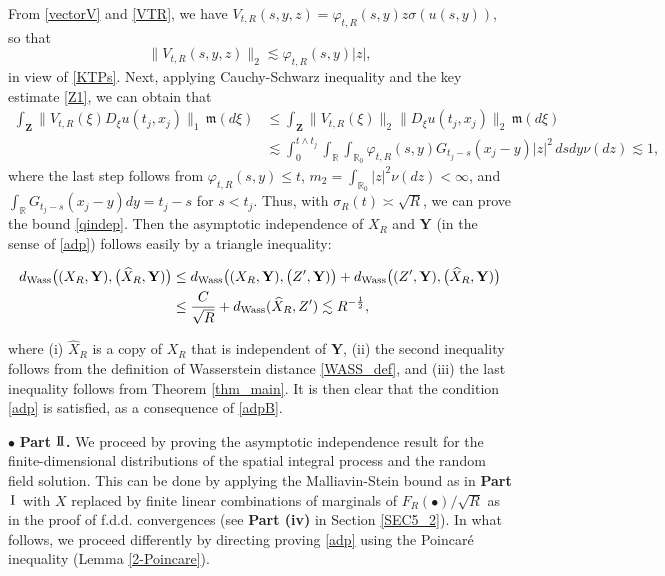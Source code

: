 \documentclass[letterpaper, 11pt,  reqno]{amsart}
\newcommand{\wh}{\widehat}
\newcommand{\I}{\hspace{0.5mm}\text{I}\hspace{0.5mm}}
\newcommand{\II}{\text{I \hspace{-2.8mm} I} }
\newcommand{\noi}{\noindent}
\newcommand{\R}{\mathbb{R}}
\newcommand{\bul}{\bullet}
\newcommand{\s}{\sigma}
\newcommand{\les}{\lesssim}
\newcommand{\fm}{\mathfrak{m}}
\numberwithin{equation}{section}
\numberwithin{theorem}{section}
\begin{document}
From \eqref{vectorV} and \eqref{VTR}, 
we have 
$V_{t,R}(s,y,z) = \varphi_{t, R}(s, y) z \s( u(s, y))$,
so that 
\[
\|V_{t,R}(s,y,z)\|_2 \les  \varphi_{t, R}(s, y) |z|, 
\]
in view of \eqref{KTPs}.
Next, applying  Cauchy-Schwarz inequality and  the key estimate \eqref{Z1},
 we can obtain that 
\begin{align*}
  \int_{\mathbf{Z}}  \big\| V_{t, R}(\xi)    D_\xi  u(t_j, x_j)   \big\|_1 \, \fm(d\xi) 
   & \leq 
   \int_{\mathbf{Z}}   \| V_{t,R}(\xi) \|_2   \| D_\xi  u(t_j, x_j)  \|_2 \, \fm(d\xi) \\
   &\les   \int_0^{t\wedge t_j} \int_\R \int_{\R_0}   \varphi_{t, R}(s, y) 
   G_{t_j-s}(x_j -y) |z|^2    \, dsdy \nu(dz) 
   \les 1,
\end{align*}
where the last step follows
from $\varphi_{t,R}(s,y) \leq t$, $m_2 = \int_{\R_0} |z|^2\nu(dz)  <\infty$,
and  $\int_\R  G_{t_j-s}(x_j -y)dy = t_j -s$ for $s< t_j$.
Thus, with $\s_R(t) \asymp \sqrt{R}$, we can prove the bound \eqref{qindep}.
Then the asymptotic independence of $X_R$ and $\mathbf{Y}$ (in the sense of 
\eqref{adp})
 follows easily by a triangle inequality: 
 
 \noi
 \begin{align}\label{adpB}
 \begin{aligned}
  d_{\rm Wass}\big(   (X_R ,   \mathbf{Y} ), 
 \big(\wh{X}_R,   \mathbf{Y}   )  \big)  
& \leq  d_{\rm Wass}\big(   (X_R ,   \mathbf{Y} ), 
 \big(Z',   \mathbf{Y}   )  \big)   +  d_{\rm Wass}\big(   (Z' ,   \mathbf{Y} ), 
 \big(\wh{X}_R,   \mathbf{Y}   )  \big)   \\
 &\leq \frac{C}{\sqrt{R}} + d_{\rm Wass} (\wh X_R,   Z' )    \les R^{-\frac12},
 \end{aligned}
 \end{align}

\noi
where  (i) $\wh X_R$ is a  copy of $X_R$ that is independent of $\mathbf{Y}$,
 (ii)  the second inequality follows from the definition of Wasserstein distance \eqref{WASS_def},
and (iii)  the last inequality follows from Theorem \ref{thm_main}.
It is then clear that the condition \eqref{adp} is satisfied,
 as a consequence of  \eqref{adpB}.


\smallskip
\noi
$\bul$ {\bf Part $\II$.} We  proceed by proving the   asymptotic independence 
result for  the finite-dimensional distributions of the spatial integral process
and the random field solution. 
This can be done by applying the Malliavin-Stein bound as in 
 {\bf Part $\I$} with $X$ replaced by finite linear combinations 
 of marginals of $F_R(\bul)/\sqrt{R}$ as in the proof of f.d.d. convergences
 (see {\bf Part (iv)} in Section \ref{SEC5_2}).
In what follows, we proceed differently by directing proving \eqref{adp} using
the Poincar\'e inequality (Lemma \ref{2-Poincare}). 
\end{document}
